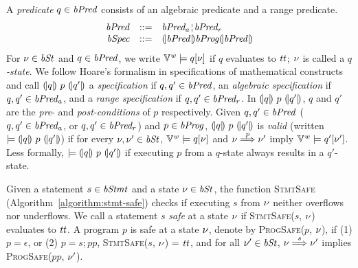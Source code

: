 A \emph{predicate} $q \in \mathit{bPred}$ consists of an algebraic predicate and a range predicate.
\[
\begin{array}{rcl}
  \bvPred & ::= & \bvPreda \andar \bvPredr \\
  \bvSpec & ::= & \cond{\bvPred} \bvProg \cond{\bvPred}
\end{array}
\]
For $\nu \in \mathit{bSt}$ and $q \in \mathit{bPred}$, we write $\mathbb{V}^{\mathit{w}} \models q[\nu]$ if $q$ evaluates to $\mathit{tt}$; $\nu$ is called a \emph{$q$-state}.
We follow Hoare's formalism in specifications of mathematical constructs~\cite{H:69:ABCP} and call ${(\!|}{q}{|\!)}~{p}~{(\!|}{q'}{|\!)}$ a \emph{specification} if $q,q' \in \mathit{bPred}$, an \emph{algebraic specification} if $q,q' \in \mathit{bPred_a}$, and a \emph{range specification} if $q,q' \in \mathit{bPred_r}$.
In ${(\!|}{q}{|\!)}~{p}~{(\!|}{q'}{|\!)}$, $q$ and $q'$ are the \emph{pre}- and \emph{post-conditions} of $p$ respectively.
Given $q, q' \in \mathit{bPred}$ ($q,q' \in \mathit{bPred_a}$, or $q,q' \in \mathit{bPred_r}$) and $p \in \mathit{bProg}$, ${(\!|}{q}{|\!)}~{p}~{(\!|}{q'}{|\!)}$ is \emph{valid} (written $\models {(\!|}{q}{|\!)}~{p}~{(\!|}{q'}{|\!)}$) if for every $\nu, \nu' \in \mathit{bSt}$, $\mathbb{V}^{\mathit{w}} \models q[\nu]$ and $\nu \overset{p}{\Longrightarrow} \nu'$ imply $\mathbb{V}^{\mathit{w}} \models q'[\nu']$.
Less formally, $\models {(\!|}{q}{|\!)}~{p}~{(\!|}{q'}{|\!)}$ if executing $p$ from a $q$-state always results in a $q'$-state.

Given a statement $s \in \mathit{bStmt}$ and a state $\nu \in \mathit{bSt}$, the function \textsc{StmtSafe} (Algorithm~\ref{algorithm:stmt-safe}) checks if executing $s$ from $\nu$ neither overflows nor underflows.
We call a statement $s$ \emph{safe} at a state $\nu$ if \textsc{StmtSafe}($s$, $\nu$) evaluates to $\mathit{tt}$.
A program $p$ is safe at a state $\nu$, denote by \textsc{ProgSafe}($p$, $\nu$), if (1) $p = \epsilon$, or (2) $p = s; pp$, \textsc{StmtSafe}($s$, $\nu$) = $\mathit{tt}$, and for all $\nu' \in \mathit{bSt}$, $\nu \overset{s}{\Longrightarrow} \nu'$ implies \textsc{ProgSafe}($pp$, $\nu'$).


